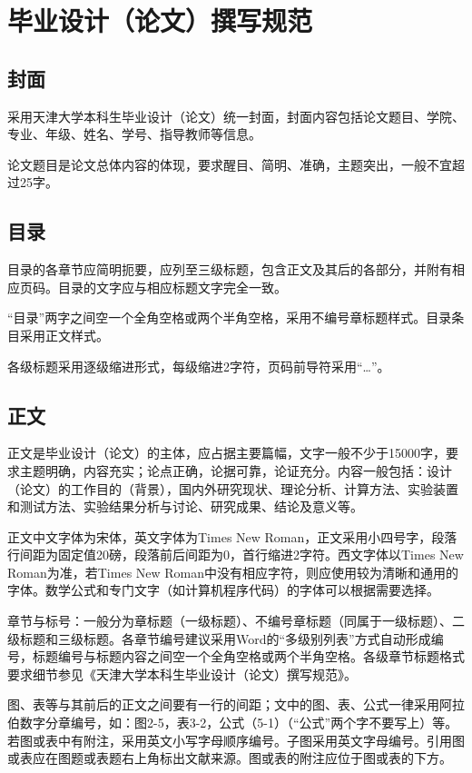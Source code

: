 \section{毕业设计（论文）撰写规范}

\subsection{封面}

采用天津大学本科生毕业设计（论文）统一封面，封面内容包括论文题目、学院、专业、年级、姓名、学号、指导教师等信息。

论文题目是论文总体内容的体现，要求醒目、简明、准确，主题突出，一般不宜超过25字。

\subsection{目录}

目录的各章节应简明扼要，应列至三级标题，包含正文及其后的各部分，并附有相应页码。目录的文字应与相应标题文字完全一致。

“目录”两字之间空一个全角空格或两个半角空格，采用不编号章标题样式。目录条目采用正文样式。

各级标题采用逐级缩进形式，每级缩进2字符，页码前导符采用“…”。

\subsection{正文}

正文是毕业设计（论文）的主体，应占据主要篇幅，文字一般不少于15000字，要求主题明确，内容充实；论点正确，论据可靠，论证充分。内容一般包括：设计（论文）的工作目的（背景），国内外研究现状、理论分析、计算方法、实验装置和测试方法、实验结果分析与讨论、研究成果、结论及意义等。

正文中文字体为宋体，英文字体为Times New Roman，正文采用小四号字，段落行间距为固定值20磅，段落前后间距为0，首行缩进2字符。西文字体以Times New Roman为准，若Times New Roman中没有相应字符，则应使用较为清晰和通用的字体。数学公式和专门文字（如计算机程序代码）的字体可以根据需要选择。

章节与标号：一般分为章标题（一级标题）、不编号章标题（同属于一级标题）、二级标题和三级标题。各章节编号建议采用Word的“多级别列表”方式自动形成编号，标题编号与标题内容之间空一个全角空格或两个半角空格。各级章节标题格式要求细节参见《天津大学本科生毕业设计（论文）撰写规范》。

图、表等与其前后的正文之间要有一行的间距；文中的图、表、公式一律采用阿拉伯数字分章编号，如：图2-5，表3-2，公式（5-1）（“公式”两个字不要写上）等。若图或表中有附注，采用英文小写字母顺序编号。子图采用英文字母编号。引用图或表应在图题或表题右上角标出文献来源。图或表的附注应位于图或表的下方。

